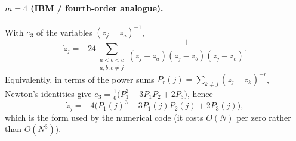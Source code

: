 \documentclass[11pt]{article}
\theoremstyle{plain}
\theoremstyle{definition}
\begin{document}
\paragraph{$m=4$ (IBM / fourth-order analogue).}
With $e_3$ of the variables $(z_j-z_a)^{-1}$,
\begin{equation}\label{eq:m4}
  \dot z_j=-24\!\!\sum_{\substack{a<b<c\\ a,b,c\neq j}}
            \frac{1}{(z_j-z_a)(z_j-z_b)(z_j-z_c)} .
\end{equation}
Equivalently, in terms of the power sums
$P_r(j)=\sum_{k\neq j}(z_j-z_k)^{-r}$, Newton's identities give
$e_3=\tfrac16\bigl(P_1^3-3P_1P_2+2P_3\bigr)$, hence
\begin{equation}\label{eq:m4-power}
  \dot z_j=-4\bigl(P_1(j)^3-3P_1(j)P_2(j)+2P_3(j)\bigr),
\end{equation}
which is the form used by the numerical code (it costs $O(N)$ per zero rather
than $O(N^3)$).
\end{document}

